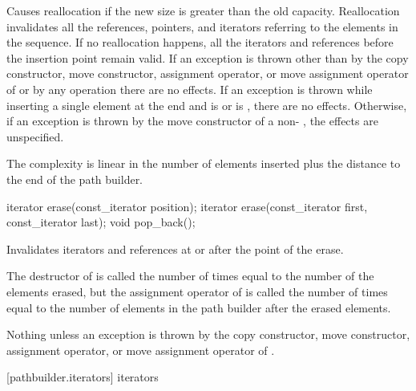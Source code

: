 \begin{itemdescr}
\pnum
\remarks
Causes reallocation if the new size is greater than the old capacity.
Reallocation invalidates all the references, pointers, and iterators
referring to the elements in the sequence.
If no reallocation happens, all the iterators and references before the insertion point remain valid.
If an exception is thrown other than by
the copy constructor, move constructor,
assignment operator, or move assignment operator of
 or by any  operation
there are no effects.
If an exception is thrown while inserting a single element at the end and
 is  or 
is , there are no effects.
Otherwise, if an exception is thrown by the move constructor of a non-
, the effects are unspecified.

\pnum
\complexity
The complexity is linear in the number of elements inserted plus the 
distance to the end of the path builder.
\end{itemdescr}

%
%
\begin{itemdecl}
iterator erase(const_iterator position);
iterator erase(const_iterator first, const_iterator last);
void pop_back();
\end{itemdecl}

\begin{itemdescr}
\pnum
\effects
Invalidates iterators and references at or after the point of the erase.

\pnum
\complexity
The destructor of  is called the number of times equal to 
the number of the elements erased, but the assignment operator
of  is called the number of times equal to the number of
elements in the path builder after the erased elements.

\pnum
\throws
Nothing unless an exception is thrown by the copy constructor, move 
constructor, assignment operator, or move assignment operator of
.
\end{itemdescr}

 [pathbuilder.iterators] { iterators}

